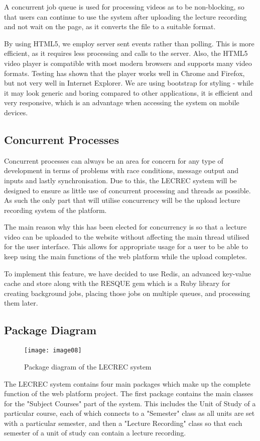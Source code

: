 \documentclass{article}
\begin{document}
A concurrent job queue is used for processing videos as to be non-blocking, so that users can continue to use the system after uploading the lecture recording and not wait on the page, as it converts the file to a suitable format. 

By using HTML5, we employ server sent events rather than polling. This is more efficient, as it requires less processing and calls to the server. Also, the HTML5 video player is compatible with most modern browsers and supports many video formats. Testing has shown that the player works well in Chrome and Firefox, but not very well in Internet Explorer. We are using bootstrap for styling - while it may look generic and boring compared to other applications, it is efficient and very responsive, which is an advantage when accessing the system on mobile devices.

\subsection{Concurrent Processes}
Concurrent processes can always be an area for concern for any type of development in terms of problems with race conditions, message output and inputs and lastly synchronisation. Due to this, the LECREC system will be designed to ensure as little use of concurrent processing and threads as possible. As such the only part that will utilise concurrency will be the upload lecture recording system of the platform. 

The main reason why this has been elected for concurrency is so that a lecture video can be uploaded to the website without affecting the main thread utilised for the user interface. This allows for appropriate usage for a user to be able to keep using the main functions of the web platform while the upload completes.

To implement this feature, we have decided to use Redis, an advanced key-value cache and store along with the RESQUE gem which is a Ruby library for creating background jobs, placing those jobs on multiple queues, and processing them later.

\subsection{Package Diagram}
\begin{figure}[h!]
\centering
\texttt{[image: image08]}
\caption{Package diagram of the LECREC system}
\end{figure}
The LECREC system contains four main packages which make up the complete function of the web platform project. The first package contains the main classes for the "Subject Courses" part of the system. This includes the Unit of Study of a particular course, each of which connects to a "Semester" class as all units are set with a particular semester, and then a "Lecture Recording" class so that each semester of a unit of study can contain a lecture recording.
\end{document}
